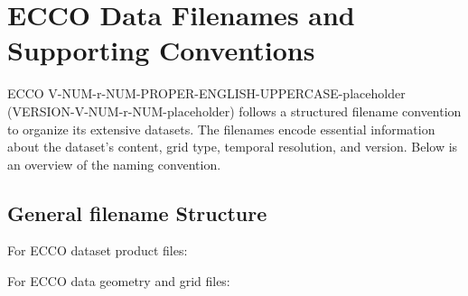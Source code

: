 \pagebreak
\section{ECCO Data Filenames and Supporting Conventions}


ECCO V-NUM-r-NUM-PROPER-ENGLISH-UPPERCASE-placeholder (VERSION-V-NUM-r-NUM-placeholder) follows a structured filename convention to organize its extensive datasets. The filenames encode essential information about the dataset's content, grid type, temporal resolution, and version. Below is an overview of the naming convention.

\subsection{General filename Structure}
\par \vspace{0.25cm}

\par For ECCO dataset product files:

\par \vspace{0.5cm}
\begin{center}
\small{\textbf{\selectfont{[ShortName]\_[TemporalResolution]\_[Indicative Time]\_ECCO\_[Version]\_[GridType].<File Type>}}}
\end{center}
\par \vspace{0.5cm}
\par For ECCO data geometry and grid files:

\par \vspace{0.5cm}
\begin{center}
    \small{\textbf{\selectfont{[ShortName]\_ECCO\_[Version]\_[GridType].<File Type>}}}
\end{center}
\par \vspace{0.25cm}

